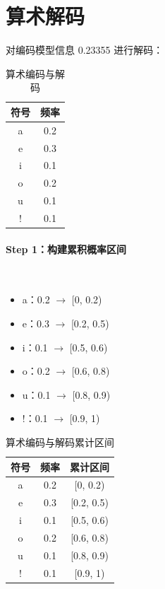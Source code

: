 \documentclass{article}
\begin{document}
\section{算术解码}
对编码模型信息 0.23355 进行解码：

\begin{table}[H]
    \centering
    \setlength{\tabcolsep}{64pt}
    \renewcommand{\arraystretch}{1.2}
    \caption{算术编码与解码}
    \begin{tabular}{cc}
        \bottomrule[1.5pt]
        符号 & 频率 \\
        \midrule[0.75pt]
        a & 0.2 \\
        e & 0.3 \\
        i & 0.1 \\
        o & 0.2 \\
        u & 0.1 \\
        ! & 0.1 \\
        \toprule[1.5pt]
    \end{tabular}
\end{table}

\paragraph*{Step 1：构建累积概率区间}~{}

\begin{itemize}
    \item a：0.2 $\to$ [0, 0.2)
    \item e：0.3 $\to$ [0.2, 0.5)
    \item i：0.1 $\to$ [0.5, 0.6)
    \item o：0.2 $\to$ [0.6, 0.8)
    \item u：0.1 $\to$ [0.8, 0.9)
    \item !：0.1 $\to$ [0.9, 1)
\end{itemize}

\begin{table}[H]
    \centering
    \setlength{\tabcolsep}{32pt}
    \renewcommand{\arraystretch}{1.2}
    \caption{算术编码与解码累计区间}
    \begin{tabular}{ccc}
        \bottomrule[1.5pt]
        符号 & 频率 & 累计区间 \\
        \midrule[0.75pt]
        a & 0.2 & [0, 0.2) \\
        e & 0.3 & [0.2, 0.5) \\
        i & 0.1 & [0.5, 0.6) \\
        o & 0.2 & [0.6, 0.8) \\
        u & 0.1 & [0.8, 0.9) \\
        ! & 0.1 & [0.9, 1) \\
        \toprule[1.5pt]
    \end{tabular}
\end{table}
\end{document}
